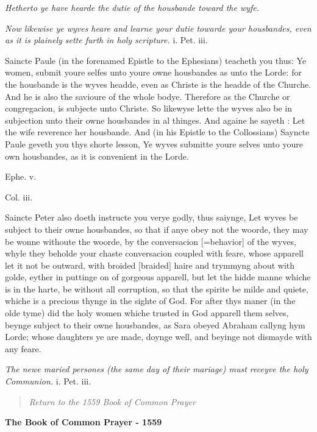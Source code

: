 \emph{Hetherto
ye have hearde the dutie of the housbande toward the wyfe.}

\emph{Now
likewise ye wyves heare and learne your dutie towarde your housbandes,
even as it is plainely sette furth in holy scripture.} i.
Pet. iii.

Saincte Paule (in
the forenamed Epistle to the Ephesians) teacheth you thus: Ye women, submit
youre selfes unto youre owne housbandes as unto the Lorde: for the housbande
is the wyves headde, even as Christe is the headde of the Churche. And
he is also the savioure of the whole bodye. Therefore as the Churche or
congregacion, is subjecte unto Christe. So likewyse lette the wyves also
be in subjection unto their owne housbandes in al thinges. And againe
he sayeth : Let the wife reverence her housbande. And (in his Epistle
to the Collossians) Sayncte Paule geveth you thys shorte lesson, Ye wyves
submitte youre selves unto youre own housbandes, as it is convenient in
the Lorde.

Ephe.
v.

Col. iii.

Saincte Peter also doeth instructe you verye godly, thus saiynge, Let
wyves be subject to their owne housbandes, so that if anye obey not the
woorde, they may be wonne withoute the woorde, by the conversacion
[=behavior]
of the wyves, whyle they beholde your chaste conversacion coupled with
feare, whose apparell let it not be outward, with broided [braided]
haire and trymmyng about with golde, eyther in puttinge on of gorgeous
apparell, but let the hidde manne whiche is in the harte, be without all
corruption, so that the spirite be milde and quiete, whiche is a precious
thynge in the sighte of God. For after thys maner (in the olde tyme) did
the holy women whiche trusted in God apparell them selves, beynge subject
to their owne housbandes, as Sara obeyed Abraham callyng hym Lorde; whose
daughters ye are made, doynge well, and beyinge not dismayde with any
feare.

\emph{The
newe maried persones (the same day of their mariage) must receyve the
holy Communion.} i.
Pet. iii.

\begin{quote}

\emph{Return to the 1559
Book of Common Prayer}

\end{quote}


\textbf{The Book of Common Prayer - 1559}

